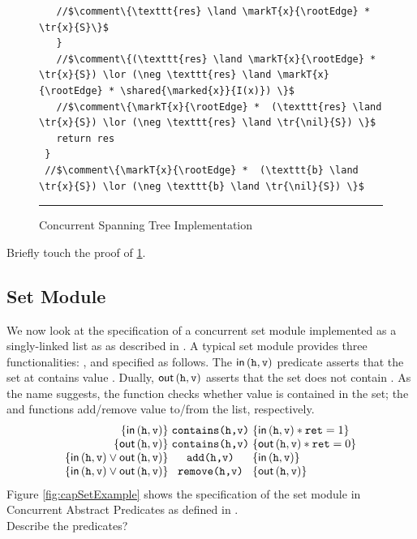 \begin{figure}
\begin{lstlisting}
   //$\comment\{\texttt{res} \land \markT{x}{\rootEdge} *  \tr{x}{S}\}$      
   }		
   //$\comment\{(\texttt{res} \land \markT{x}{\rootEdge} * \tr{x}{S}) \lor (\neg \texttt{res} \land \markT{x}{\rootEdge} * \shared{\marked{x}}{I(x)}) \}$   
   //$\comment\{\markT{x}{\rootEdge} *  (\texttt{res} \land \tr{x}{S}) \lor (\neg \texttt{res} \land \tr{\nil}{S}) \}$      
   return res
 }
 //$\comment\{\markT{x}{\rootEdge} *  (\texttt{b} \land \tr{x}{S}) \lor (\neg \texttt{b} \land \tr{\nil}{S}) \}$      
\end{lstlisting}
\hrule\vspace*{5pt}
\caption{Concurrent Spanning Tree Implementation}
\label{fig:conSpanningTree}
\end{figure}
%

\todo Briefly touch the proof of \fig\ref{fig:conSpanningTree}.

\subsection{Set Module}
We now look at the specification of a concurrent set module implemented as a singly-linked list as as described in \cite{cap-ecoop10}. A typical set module provides three functionalities: ,  and  specified as follows. The $\textsf{in}\left(\texttt{h}, \texttt{v}\right) $ predicate asserts that the set at  contains value . Dually, $\textsf{out}\left(\texttt{h}, \texttt{v}\right)$ asserts that the set does not contain . As the name suggests, the  function checks whether value  is contained in the set; the  and  functions add/remove value  to/from the list, respectively. 
%
\[
\begin{array}{@{} r @{\hspace*{3pt}} c @{\hspace*{3pt}} l @{}}
	\left\{ \inSet{\var{h}}{\var{v}} \right\} & \command{contains(h,v)} & \left\{ \inSet{\var{h}}{\var{v}} * \var{ret} = 1 \right\} \\
	
	\left\{ \outSet{\var{h}}{\var{v}} \right\} & \command{contains(h,v)} & \left\{ \outSet{\var{h}}{\var{v}} * \var{ret} = 0 \right\} \\
	
	\left\{ \inSet{\var{h}}{\var{v}} \lor \outSet{\var{h}}{\var{v}}  \right\} & \command{add(h,v)} & \left\{ \inSet{\var{h}}{\var{v}} \right\}\\ 
	
	\left\{ \inSet{\var{h}}{\var{v}} \lor \outSet{\var{h}}{\var{v}}  \right\} & \command{remove(h,v)} & \left\{ \outSet{\var{h}}{\var{v}} \right\} 
\end{array}
\]
%
Figure \ref{fig:capSetExample} shows the specification of the set module in Concurrent Abstract Predicates as defined in \cite{cap-ecoop10}.\\
\todo Describe the predicates?

